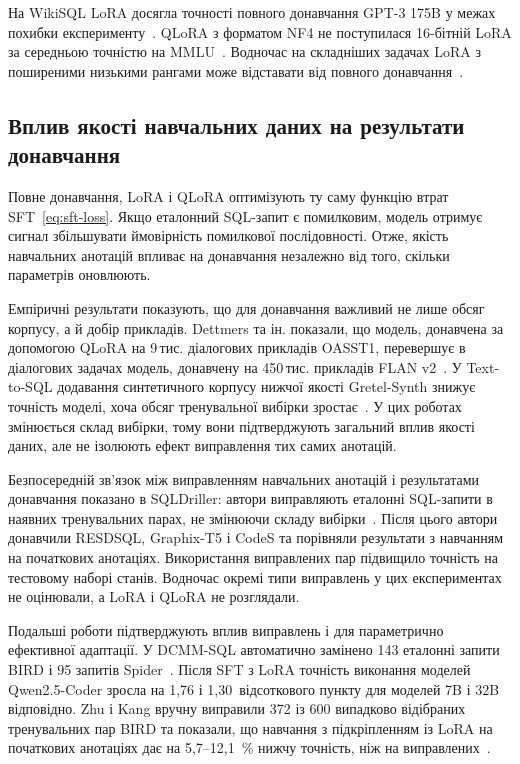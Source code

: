 \documentclass[a4paper,14pt,oneside]{extreport}
\begin{document}
На WikiSQL LoRA досягла точності повного донавчання GPT-3 175B у межах похибки експерименту~\cite{hu2022lora}. QLoRA з форматом NF4 не поступилася 16-бітній LoRA за середньою точністю на MMLU~\cite{dettmers2023qlora}. Водночас на складніших задачах LoRA з поширеними низькими рангами може відставати від повного донавчання~\cite{biderman2024loralearns,mao2025lorasurvey}.

\subsection{Вплив якості навчальних даних на результати донавчання}
\label{subsec:data-quality-impact}

Повне донавчання, LoRA і QLoRA оптимізують ту саму функцію втрат SFT~\eqref{eq:sft-loss}. Якщо еталонний SQL-запит є помилковим, модель отримує сигнал збільшувати ймовірність помилкової послідовності. Отже, якість навчальних анотацій впливає на донавчання незалежно від того, скільки параметрів оновлюють.

Емпіричні результати показують, що для донавчання важливий не лише обсяг корпусу, а й добір прикладів. Dettmers та ін. показали, що модель, донавчена за допомогою QLoRA на 9\,тис. діалогових прикладів OASST1, перевершує в діалогових задачах модель, донавчену на 450\,тис. прикладів FLAN v2~\cite{dettmers2023qlora}. У Text-to-SQL додавання синтетичного корпусу нижчої якості Gretel-Synth знижує точність моделі, хоча обсяг тренувальної вибірки зростає~\cite{yao2025arctic}. У цих роботах змінюється склад вибірки, тому вони підтверджують загальний вплив якості даних, але не ізолюють ефект виправлення тих самих анотацій.

Безпосередній зв’язок між виправленням навчальних анотацій і результатами донавчання показано в SQLDriller: автори виправляють еталонні SQL-запити в наявних тренувальних парах, не змінюючи складу вибірки~\cite{yang2025sqldriller}. Після цього автори донавчили RESDSQL, Graphix-T5 і CodeS та порівняли результати з навчанням на початкових анотаціях. Використання виправлених пар підвищило точність на тестовому наборі станів. Водночас окремі типи виправлень у цих експериментах не оцінювали, а LoRA і QLoRA не розглядали.

Подальші роботи підтверджують вплив виправлень і для параметрично ефективної адаптації. У DCMM-SQL автоматично замінено 143 еталонні запити BIRD і 95 запитів Spider~\cite{xie2025dcmm}. Після SFT з LoRA точність виконання моделей Qwen2.5-Coder зросла на 1,76 і 1,30~відсоткового пункту для моделей 7B і 32B відповідно. Zhu і Kang вручну виправили 372 із 600 випадково відібраних тренувальних пар BIRD та показали, що навчання з підкріпленням із LoRA на початкових анотаціях дає на 5,7--12,1~\% нижчу точність, ніж на виправлених~\cite{zhu2026noisy}.
\end{document}
